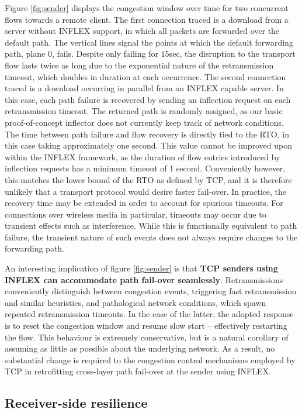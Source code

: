 Figure \ref{fig:sender} displays the congestion window over time for two concurrent flows towards a remote client.
The first connection traced is a download from a server without INFLEX support, in which all packets are forwarded over the default path.
The vertical lines signal the points at which the default forwarding path, plane $0$, fails.
Despite only failing for $15$sec, the disruption to the transport flow lasts twice as long due to the exponential nature of the retransmission timeout, which doubles in duration at each occurrence.
The second connection traced is a download occurring in parallel from an INFLEX capable server. 
In this case, each path failure is recovered by sending an inflection request on each retransmission timeout.
The returned path is randomly assigned, as our basic proof-of-concept inflector does not currently keep track of network conditions.
The time between path failure and flow recovery is directly tied to the \ac{RTO}, in this case taking approximately one second. 
This value cannot be improved upon within the INFLEX framework, as the duration of flow entries introduced by inflection requests has a minimum timeout of 1 second.
Conveniently however, this matches the lower bound of the \ac{RTO} as defined by \ac{TCP}, and it is therefore unlikely that a transport protocol would desire faster fail-over.
In practice, the recovery time may be extended in order to account for spurious timeouts.
For connections over wireless media in particular, timeouts may occur due to transient effects such as interference.
While this is functionally equivalent to path failure, the transient nature of such events does not always require changes to the forwarding path.

An interesting implication of figure \ref{fig:sender} is that \textbf{\ac{TCP} senders using INFLEX can accommodate path fail-over seamlessly}.
Retransmissions conveniently distinguish between congestion events, triggering fast retransmission and similar heuristics, and pathological network conditions, which spawn repeated retransmission timeouts.
In the case of the latter, the adopted response is to reset the congestion window and resume slow start -- effectively restarting the flow.
This behaviour is extremely conservative, but is a natural corollary of assuming as little as possible about the underlying network.
As a result, no substantial change is required to the congestion control mechanisms employed by \ac{TCP} in retrofitting cross-layer path fail-over at the sender using INFLEX.

\subsection{Receiver-side resilience}

